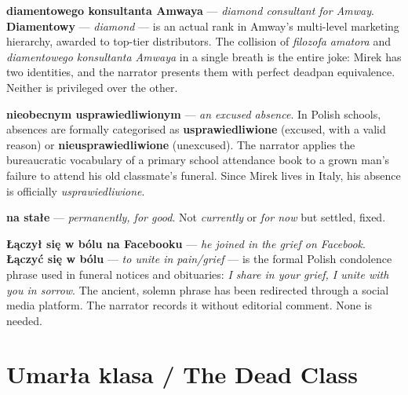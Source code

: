 \textbf{diamentowego konsultanta Amwaya} --- \textit{diamond consultant
for Amway}. \textbf{Diamentowy} --- \textit{diamond} --- is an actual
rank in Amway's multi-level marketing hierarchy, awarded to top-tier
distributors. The collision of \textit{filozofa amatora} and
\textit{diamentowego konsultanta Amwaya} in a single breath is the
entire joke: Mirek has two identities, and the narrator presents them
with perfect deadpan equivalence. Neither is privileged over the other.



\textbf{nieobecnym usprawiedliwionym} --- \textit{an excused absence}.
In Polish schools, absences are formally categorised as
\textbf{usprawiedliwione} (excused, with a valid reason) or
\textbf{nieusprawiedliwione} (unexcused). The narrator applies the
bureaucratic vocabulary of a primary school attendance book to a grown
man's failure to attend his old classmate's funeral. Since Mirek lives
in Italy, his absence is officially \textit{usprawiedliwione}.

\textbf{na stałe} --- \textit{permanently, for good}. Not
\textit{currently} or \textit{for now} but settled, fixed.

\textbf{Łączył się w bólu na Facebooku} --- \textit{he joined in the
grief on Facebook}. \textbf{Łączyć się w bólu} --- \textit{to unite
in pain/grief} --- is the formal Polish condolence phrase used in
funeral notices and obituaries: \textit{I share in your grief, I unite
with you in sorrow}. The ancient, solemn phrase has been redirected
through a social media platform. The narrator records it without
editorial comment. None is needed.

\section{Umarła klasa / The Dead Class}


